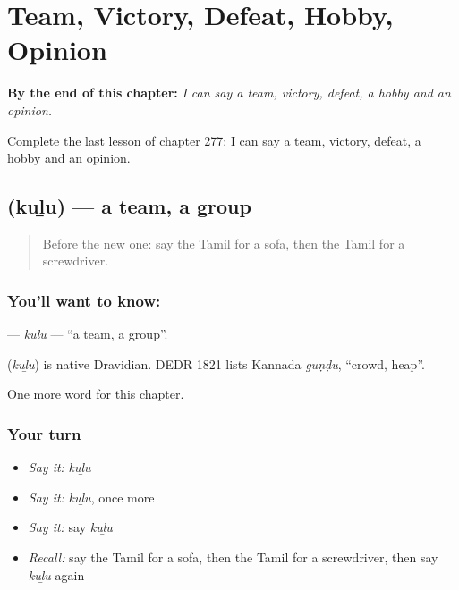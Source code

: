 
\chapter{Team, Victory, Defeat, Hobby, Opinion}
\label{ch:ta-team-victory-defeat-hobby-opinion}

\begin{chapteropening}
\textbf{By the end of this chapter:} \emph{I can say a team, victory, defeat, a hobby and an opinion.}

Complete the last lesson of chapter 277: I can say a team, victory, defeat, a hobby and an opinion.
\end{chapteropening}

\section[\texorpdfstring{\ta{குழு} (kuḻu)}{குழு (kuḻu)}]{ (kuḻu) — a team, a group}

\label{lesson:TA-C277-kulu}



\begin{quote}
Before the new one: say the Tamil for a sofa, then the Tamil for a screwdriver.
\end{quote}

\subsection*{You'll want to know: }
\textbf{} — \emph{kuḻu} — \textquotedblleft{}a team, a group\textquotedblright{}.

\begin{cousinweb}
\textbf{} (\emph{kuḻu}) is native Dravidian. DEDR 1821 lists Kannada \emph{guṇḍu}, \textquotedblleft{}crowd, heap\textquotedblright{}.
\end{cousinweb}

\begin{grammarlens}[title={What you've built}]
One more word for this chapter.
\end{grammarlens}

\subsection*{Your turn}
\begin{itemize}
\raggedright
  \item \emph{Say it:} \emph{kuḻu}
  \item \emph{Say it:} \emph{kuḻu}, once more
  \item \emph{Say it:} say \emph{kuḻu}
  \item \emph{Recall:} say the Tamil for a sofa, then the Tamil for a screwdriver, then say \emph{kuḻu} again
\end{itemize}

